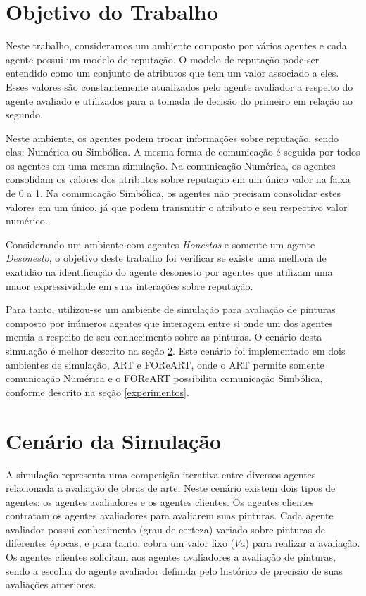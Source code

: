 \documentclass[]{article}
\begin{document}
%
\section{Objetivo do Trabalho}
\label{objetivo}
%
Neste trabalho, consideramos um ambiente composto por vários agentes e cada agente possui um modelo de reputação. O modelo de reputação pode ser entendido como um conjunto de atributos que tem um valor associado a eles. Esses valores são constantemente atualizados pelo agente avaliador a respeito do agente avaliado e utilizados para a tomada de decisão do primeiro em relação ao segundo.

Neste ambiente, os agentes podem trocar informações sobre reputação, sendo elas: Numérica ou Simbólica. A mesma forma de comunicação é seguida por todos os agentes em uma mesma simulação. Na comunicação Numérica, os agentes consolidam os valores dos atributos sobre reputação em um único valor na faixa de 0 a 1. Na comunicação Simbólica, os agentes não precisam consolidar estes valores em um único, já que podem transmitir o atributo e seu respectivo valor numérico.

Considerando um ambiente com agentes {\it Honestos} e somente um agente {\it Desonesto}, o objetivo deste trabalho foi verificar se existe uma melhora de exatidão na identificação do agente desonesto por agentes que utilizam uma maior expressividade em suas interações sobre reputação.

Para tanto, utilizou-se um ambiente de simulação para avaliação de pinturas composto por inúmeros agentes que interagem entre si onde um dos agentes mentia a respeito de seu conhecimento sobre as pinturas. O cenário desta simulação é melhor descrito na seção \ref{cenario}. Este cenário foi implementado em dois ambientes de simulação, ART e FOReART, onde o ART permite somente comunicação Numérica e o FOReART possibilita comunicação Simbólica, conforme descrito na seção \ref{experimentos}.
%
\section{Cenário da Simulação}
\label{cenario}
A simulação representa uma competição iterativa entre diversos agentes relacionada a avaliação de obras de arte. Neste cenário existem dois tipos de agentes: os agentes avaliadores e os agentes clientes. Os agentes clientes contratam os agentes avaliadores para avaliarem suas pinturas. Cada agente avaliador possui conhecimento (grau de certeza) variado sobre pinturas de diferentes épocas, e para tanto, cobra um valor fixo ($Va$) para realizar a avaliação. Os agentes clientes solicitam aos agentes avaliadores a avaliação de pinturas, sendo a escolha do agente avaliador definida pelo histórico de precisão de suas avaliações anteriores.
\end{document}
